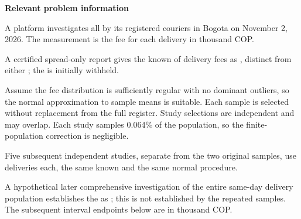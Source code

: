 \secInicio[][sec:p3]

\clearpage



\textbf{Relevant problem information}

\begin{probleminfoexcerpt}
A platform investigates all    by its registered couriers in Bogota on November 2, 2026. The measurement is the fee for each delivery in thousand COP.
\end{probleminfoexcerpt}

\begin{probleminfoexcerpt}
A certified spread-only report gives the known    of delivery fees as   , distinct from either   ; the   is initially withheld.
\end{probleminfoexcerpt}

\begin{probleminfoexcerpt}
Assume the fee distribution is sufficiently regular with no dominant outliers, so the normal approximation to sample means is suitable. Each sample is selected without replacement from the full register. Study selections are independent and may overlap. Each study samples 0.064\% of the population, so the finite-population correction is negligible.
\end{probleminfoexcerpt}

\begin{probleminfoexcerpt}
Five subsequent independent studies, separate from the two original samples, use  deliveries each, the same known    and the same  normal procedure.
\end{probleminfoexcerpt}

\begin{probleminfoexcerpt}
A hypothetical later comprehensive investigation of the entire same-day delivery population establishes the   as   ; this is not established by the repeated samples. The subsequent interval endpoints below are in thousand COP.
\end{probleminfoexcerpt}

